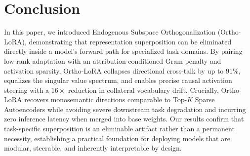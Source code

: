 \documentclass[10pt,twocolumn,letterpaper]{article}
\begin{document}
\section{Conclusion}
\label{sec:conclusion}

In this paper, we introduced Endogenous Subspace Orthogonalization (Ortho-LoRA), demonstrating that representation superposition can be eliminated directly inside a model's forward path for specialized task domains. By pairing low-rank adaptation with an attribution-conditioned Gram penalty and activation sparsity, Ortho-LoRA collapses directional cross-talk by up to 91\%, equalizes the singular value spectrum, and enables precise causal activation steering with a $16\times$ reduction in collateral vocabulary drift. Crucially, Ortho-LoRA recovers monosemantic directions comparable to Top-$K$ Sparse Autoencoders while avoiding severe downstream task degradation and incurring zero inference latency when merged into base weights. Our results confirm that task-specific superposition is an eliminable artifact rather than a permanent necessity, establishing a practical foundation for deploying models that are modular, steerable, and inherently interpretable by design.
\end{document}
